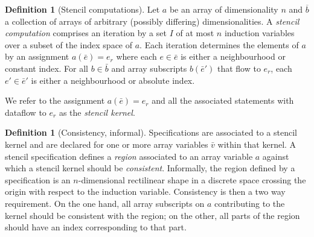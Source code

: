 \documentclass[10pt,preprint]{sigplanconf}
\newcommand{\dnote}[1]{\textcolor{darkpurple}{Dom: #1}}
\newcounter{block}
\theoremstyle{definition}
\newtheorem{definition}[block]{Definition}
\begin{document}
\begin{definition}[Stencil computations]
\label{def:stencil}
  Let $a$ be an array of dimensionality $n$ and $\overline{b}$ a
  collection of arrays of arbitrary (possibly differing)
  dimensionalities.
  A \emph{stencil computation} comprises an iteration by a set $I$ of at
  most $n$ induction variables
  over a subset of the index space of $a$. Each iteration
  determines the elements of $a$ by an
  assignment $a(\bar{e}) = e_r$ where each $e \in
  \bar{e}$ is either a neighbourhood or constant index.
  For all $b \in \bar{b}$ and array subscripts $b(\bar{e}')$
  that flow to $e_r$, each $e' \in \bar{e}'$ is
  either a neighbourhood or absolute index.

  We refer to the assignment $a(\bar{e}) = e_r$ and all the associated
  statements with dataflow to $e_r$ as the \emph{stencil kernel}.
\end{definition}
%
%
\begin{definition}[Consistency, informal]
Specifications are associated to a stencil kernel
and are declared for one or more array variables
$\bar{v}$ within that kernel.
  A stencil specification defines a \emph{region} associated to an
  array variable $a$ against which a stencil kernel should be
  \emph{consistent}. Informally, the region defined by a specification
  is an $n$-dimensional rectilinear shape in a discrete space crossing the origin with respect to the induction
  variable. Consistency is then a two way requirement.
  On the one hand, all array subscripts on $a$ contributing to the kernel
  should be consistent with the region; on the other, all parts of the
  region should have an index corresponding to that part.
\end{definition}
\end{document}

